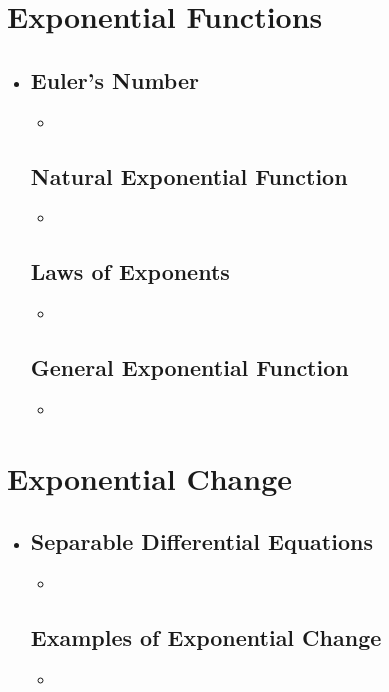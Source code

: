 \section{Exponential Functions}
\begin{itemize}
  \item []

  \subsection{Euler's Number}
  \begin{itemize}
    \item
  \end{itemize}

  \subsection{Natural Exponential Function}
  \begin{itemize}
    \item
  \end{itemize}

  \subsection{Laws of Exponents}
  \begin{itemize}
    \item
  \end{itemize}

  \subsection{General Exponential Function}
  \begin{itemize}
    \item
  \end{itemize}

\end{itemize}

\section{Exponential Change}
  \begin{itemize}
    \item

  \subsection{Separable Differential Equations}
  \begin{itemize}
    \item
  \end{itemize}

  \subsection{Examples of Exponential Change}
  \begin{itemize}
    \item
  \end{itemize}

\end{itemize}


